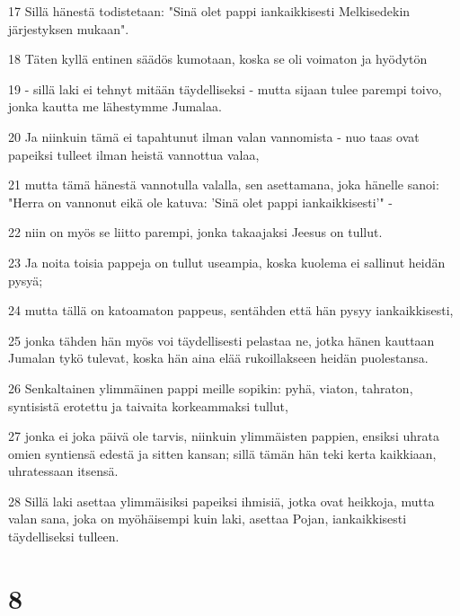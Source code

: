 \par 17 Sillä hänestä todistetaan: "Sinä olet pappi iankaikkisesti Melkisedekin järjestyksen mukaan".
\par 18 Täten kyllä entinen säädös kumotaan, koska se oli voimaton ja hyödytön
\par 19 - sillä laki ei tehnyt mitään täydelliseksi - mutta sijaan tulee parempi toivo, jonka kautta me lähestymme Jumalaa.
\par 20 Ja niinkuin tämä ei tapahtunut ilman valan vannomista - nuo taas ovat papeiksi tulleet ilman heistä vannottua valaa,
\par 21 mutta tämä hänestä vannotulla valalla, sen asettamana, joka hänelle sanoi: "Herra on vannonut eikä ole katuva: 'Sinä olet pappi iankaikkisesti'" -
\par 22 niin on myös se liitto parempi, jonka takaajaksi Jeesus on tullut.
\par 23 Ja noita toisia pappeja on tullut useampia, koska kuolema ei sallinut heidän pysyä;
\par 24 mutta tällä on katoamaton pappeus, sentähden että hän pysyy iankaikkisesti,
\par 25 jonka tähden hän myös voi täydellisesti pelastaa ne, jotka hänen kauttaan Jumalan tykö tulevat, koska hän aina elää rukoillakseen heidän puolestansa.
\par 26 Senkaltainen ylimmäinen pappi meille sopikin: pyhä, viaton, tahraton, syntisistä erotettu ja taivaita korkeammaksi tullut,
\par 27 jonka ei joka päivä ole tarvis, niinkuin ylimmäisten pappien, ensiksi uhrata omien syntiensä edestä ja sitten kansan; sillä tämän hän teki kerta kaikkiaan, uhratessaan itsensä.
\par 28 Sillä laki asettaa ylimmäisiksi papeiksi ihmisiä, jotka ovat heikkoja, mutta valan sana, joka on myöhäisempi kuin laki, asettaa Pojan, iankaikkisesti täydelliseksi tulleen.

\chapter{8}


